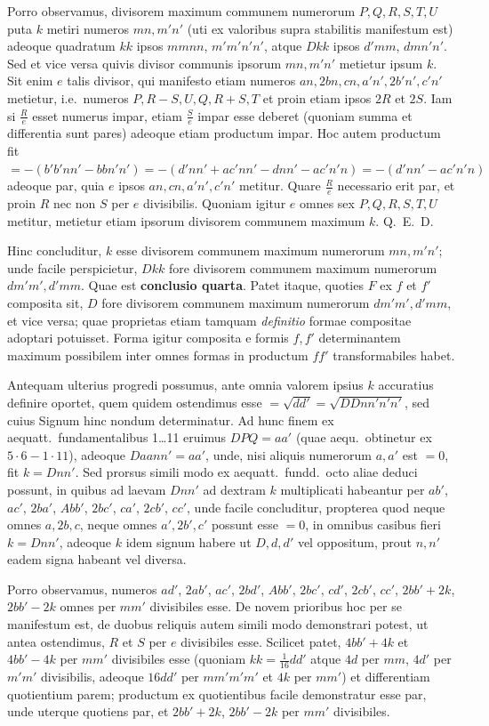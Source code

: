 \documentclass[12pt,a4paper]{article}
\theoremstyle{plain}
\theoremstyle{definition}
\theoremstyle{remark}
\theoremstyle{problemstyle}
\begin{document}
Porro observamus, divisorem maximum communem numerorum $P, Q, R, S, T, U$ puta $k$ metiri numeros $mn, m'n'$ (uti ex valoribus supra stabilitis manifestum est) adeoque quadratum $kk$ ipsos $mmnn$, $m'm'n'n'$, atque $Dkk$ ipsos $d'mm$, $dmn'n'$. Sed et vice versa quivis divisor communis ipsorum $mn, m'n'$ metietur ipsum $k$. Sit enim $e$ talis divisor, qui manifesto etiam numeros $an, 2bn, cn, a'n', 2b'n', c'n'$ metietur, i.e.\ numeros $P, R-S, U, Q, R+S, T$ et proin etiam ipsos $2R$ et $2S$. Iam si $\frac{R}{e}$ esset numerus impar, etiam $\frac{S}{e}$ impar esse deberet (quoniam summa et differentia sunt pares) adeoque etiam productum impar. Hoc autem productum fit $= -(b'b'nn' - bb n'n') = -(d'nn' + ac'nn' - dnn' - ac'n'n) = -(d'nn' - ac'n'n)$ adeoque par, quia $e$ ipsos $an, cn, a'n', c'n'$ metitur. Quare $\frac{R}{e}$ necessario erit par, et proin $R$ nec non $S$ per $e$ divisibilis. Quoniam igitur $e$ omnes sex $P, Q, R, S, T, U$ metitur, metietur etiam ipsorum divisorem communem maximum $k$. Q.\ E.\ D.

Hinc concluditur, $k$ esse divisorem communem maximum numerorum $mn, m'n'$; unde facile perspicietur, $Dkk$ fore divisorem communem maximum numerorum $dm'm', d'mm$. Quae est \textbf{conclusio quarta}. Patet itaque, quoties $F$ ex $f$ et $f'$ composita sit, $D$ fore divisorem communem maximum numerorum $dm'm', d'mm$, et vice versa; quae proprietas etiam tamquam \emph{definitio} formae compositae adoptari potuisset. Forma igitur composita e formis $f, f'$ determinantem maximum possibilem inter omnes formas in productum $ff'$ transformabiles habet.

Antequam ulterius progredi possumus, ante omnia valorem ipsius $k$ accuratius definire oportet, quem quidem ostendimus esse $= \sqrt{dd'} = \sqrt{DDnn'n'n'}$, sed cuius Signum hinc nondum determinatur. Ad hunc finem ex aequatt.\ fundamentalibus 1\ldots 11 eruimus $DPQ = aa'$ (quae aequ.\ obtinetur ex $5 \cdot 6 - 1 \cdot 11$), adeoque $Daann' = aa'$, unde, nisi aliquis numerorum $a, a'$ est $=0$, fit $k = Dnn'$. Sed prorsus simili modo ex aequatt.\ fundd.\ octo aliae deduci possunt, in quibus ad laevam $Dnn'$ ad dextram $k$ multiplicati habeantur per $ab'$, $ac'$, $2ba'$, $Abb'$, $2bc'$, $ca'$, $2cb'$, $cc'$, unde facile concluditur, propterea quod neque omnes $a, 2b, c$, neque omnes $a', 2b', c'$ possunt esse $=0$, in omnibus casibus fieri $k = Dnn'$, adeoque $k$ idem signum habere ut $D, d, d'$ vel oppositum, prout $n, n'$ eadem signa habeant vel diversa.

Porro observamus, numeros $ad'$, $2ab'$, $ac'$, $2bd'$, $Abb'$, $2bc'$, $cd'$, $2cb'$, $cc'$, $2bb'+2k$, $2bb'-2k$ omnes per $mm'$ divisibiles esse. De novem prioribus hoc per se manifestum est, de duobus reliquis autem simili modo demonstrari potest, ut antea ostendimus, $R$ et $S$ per $e$ divisibiles esse. Scilicet patet, $4bb'+4k$ et $4bb'-4k$ per $mm'$ divisibiles esse (quoniam $kk = \tfrac{1}{16}dd'$ atque $4d$ per $mm$, $4d'$ per $m'm'$ divisibilis, adeoque $16dd'$ per $mm'm'm'$ et $4k$ per $mm'$) et differentiam quotientium parem; productum ex quotientibus facile demonstratur esse par, unde uterque quotiens par, et $2bb'+2k$, $2bb'-2k$ per $mm'$ divisibiles.
\end{document}
